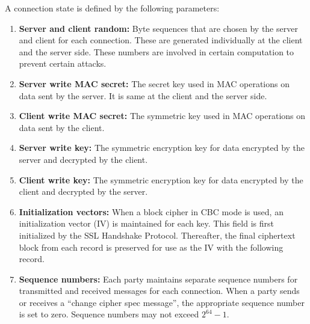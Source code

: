 \documentclass[11pt]{article}
\begin{document}
A connection state is defined by the following parameters:
\begin{enumerate}
    \item \textbf{Server and client random:} Byte sequences that are chosen by the server and client for each connection. These are generated individually at the client and the server side. These numbers are involved in certain computation to prevent certain attacks.
    \item \textbf{Server write MAC secret:} The secret key used in MAC operations on data sent by the server. It is same at the client and the server side.
    \item \textbf{Client write MAC secret:} The symmetric key used in MAC operations on data sent by the client.
    \item \textbf{Server write key:} The symmetric encryption key for data encrypted by the server and decrypted by the client.
    \item \textbf{Client write key:} The symmetric encryption key for data encrypted by the client and decrypted by the server.
    \item \textbf{Initialization vectors:} When a block cipher in CBC mode is used, an initialization vector (IV) is maintained for each key. This field is first initialized by the SSL Handshake Protocol. Thereafter, the final ciphertext block from each record is preserved for use as the IV with the following record.
    \item \textbf{Sequence numbers:} Each party maintains separate sequence numbers for transmitted and received messages for each connection. When a party sends or receives a “change cipher spec message”, the appropriate sequence number is set to zero. Sequence numbers may not exceed $2^{64} - 1$.
\end{enumerate}
\end{document}
